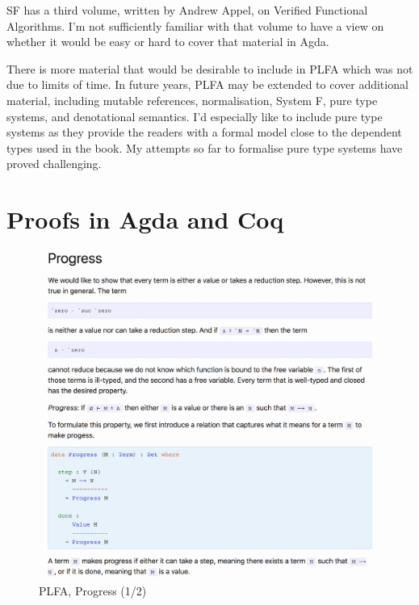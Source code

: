 \documentclass[runningheads]{llncs}
\begin{document}
SF has a third volume, written by Andrew Appel, on Verified Functional
Algorithms. I'm not sufficiently familiar with that volume to have a view
on whether it would be easy or hard to cover that material in Agda.

There is more material that would be desirable to include in PLFA
which was not due to limits of time.  In future years, PLFA may be
extended to cover additional material, including mutable references,
normalisation, System F, pure type systems, and denotational
semantics.  I'd especially like to include pure type systems as they
provide the readers with a formal model close to the dependent types
used in the book.  My attempts so far to formalise pure type systems
have proved challenging.

\section{Proofs in Agda and Coq}

\begin{figure}[t]
  \includegraphics[width=\textwidth]{figures/plfa-progress-1.png}
  \caption{PLFA, Progress (1/2)}
  \label{fig:plfa-progress-1}
\end{figure}  
\end{document}
